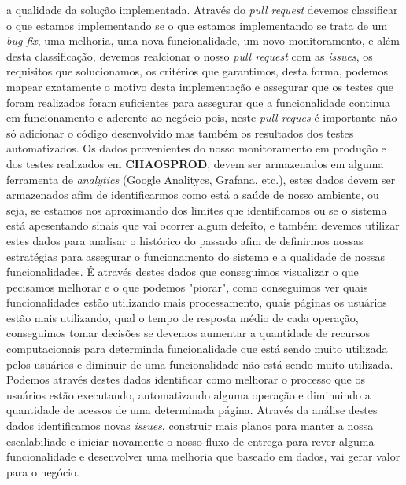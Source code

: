         a qualidade da solução implementada. Através do \textit{pull request}
        devemos classificar o que estamos implementando se o que estamos implementando
        se trata de um \textit{bug fix}, uma melhoria, uma nova funcionalidade,
        um novo monitoramento, e além desta classificação, devemos realcionar
        o nosso \textit{pull request} com as \textit{issues}, os requisitos que
        solucionamos, os critérios que garantimos, desta forma, podemos mapear
        exatamente o motivo desta implementação e assegurar que os testes que
        foram realizados foram suficientes para assegurar que a funcionalidade
        continua em funcionamento e aderente ao negócio pois, neste \textit{pull
        reques} é importante não só adicionar o código desenvolvido mas também os
        resultados dos testes automatizados. \newline
        Os dados provenientes do nosso monitoramento em produção e dos testes
        realizados em \textbf{CHAOSPROD}, devem ser armazenados em alguma ferramenta
        de \textit{analytics} (Google Analitycs, Grafana, etc.), estes dados
        devem ser armazenados afim de identificarmos como está a saúde de nosso
        ambiente, ou seja, se estamos nos aproximando dos limites que identificamos
        ou se o sistema está apesentando sinais que vai ocorrer algum defeito, e
        também devemos utilizar estes dados para analisar o histórico do passado
        afim de definirmos nossas estratégias para assegurar o funcionamento do
        sistema e a qualidade de nossas funcionalidades. É através destes dados
        que conseguimos visualizar o que pecisamos melhorar e o que podemos
        "piorar", como conseguimos ver quais funcionalidades estão utilizando
        mais processamento, quais páginas os usuários estão mais utilizando, qual
        o tempo de resposta médio de cada operação, conseguimos tomar decisões
        se devemos aumentar a quantidade de recursos computacionais para determinda
        funcionalidade que está sendo muito utilizada pelos usuários e diminuir
        de uma funcionalidade não está sendo muito utilizada. Podemos através
        destes dados identificar como melhorar o processo que os usuários estão
        executando, automatizando alguma operação e diminuindo a quantidade de
        acessos de uma determinada página. Através da análise destes dados
        identificamos novas \textit{issues}, construir mais planos para manter
        a nossa escalabiliade e iniciar novamente o nosso fluxo de entrega para
        rever alguma funcionalidade e desenvolver uma melhoria que baseado em
        dados, vai gerar valor para o negócio.

